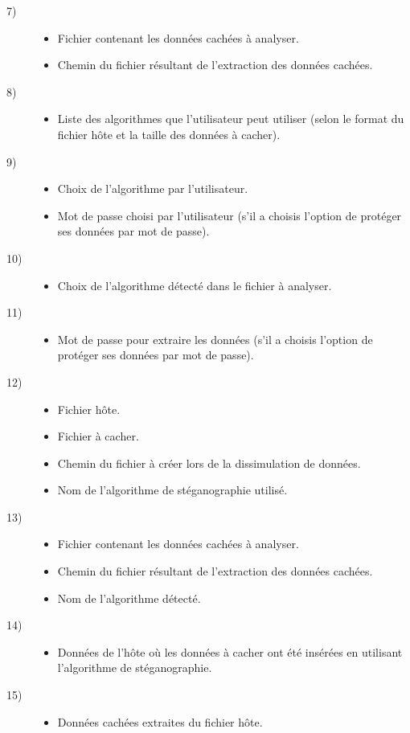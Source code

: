 \documentclass[11pt]{article}
\begin{document}
\begin{description}
\begin{itemize}
\end{itemize}
\item[7)]
\begin{itemize}
\item Fichier contenant les données cachées à analyser.
\item Chemin du fichier résultant de l'extraction des données cachées.
\end{itemize}
\item[8)]
\begin{itemize}
\item Liste des algorithmes que l'utilisateur peut utiliser (selon le format du
    fichier hôte et la taille des données à cacher).
\end{itemize}
\item[9)]
\begin{itemize}
\item Choix de l'algorithme par l'utilisateur.
\item Mot de passe choisi par l'utilisateur (s'il a choisis l'option de protéger
    ses données par mot de passe).
\end{itemize}
\item[10)]
\begin{itemize}
\item Choix de l'algorithme détecté dans le fichier à analyser.
\end{itemize}
\item[11)]
\begin{itemize}
\item Mot de passe pour extraire les données (s'il a choisis l'option de
    protéger ses données par mot de passe).
\end{itemize}
\item[12)]
\begin{itemize}
\item Fichier hôte.
\item Fichier à cacher.
\item Chemin du fichier à créer lors de la dissimulation de données.
\item Nom de l'algorithme de stéganographie utilisé.
\end{itemize}
\item[13)]
\begin{itemize}
\item Fichier contenant les données cachées à analyser.
\item Chemin du fichier résultant de l'extraction des données cachées.
\item Nom de l'algorithme détecté.
\end{itemize}
\item[14)]
\begin{itemize}
\item Données de l'hôte où les données à cacher ont été insérées en utilisant
    l'algorithme de stéganographie.
\end{itemize}
\item[15)]
\begin{itemize}
\item Données cachées extraites du fichier hôte.
\end{itemize}
\end{description}
\end{document}
